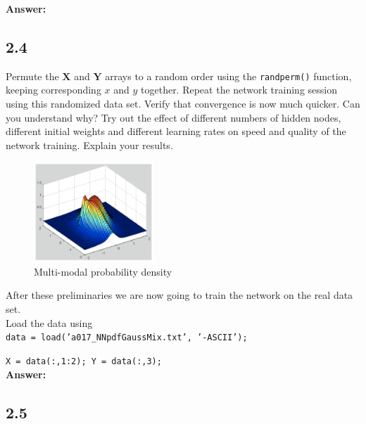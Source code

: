 \documentclass[a4paper]{article}
\begin{document}
\textbf{Answer:}\\







\subsection*{2.4}

Permute the $\textbf{X}$ and $\textbf{Y}$ arrays to a random order using the \texttt{randperm()} function, keeping corresponding $x$ and $y$ together. Repeat the network training session using this randomized data set. Verify that convergence is now much quicker. Can you understand why? Try out the effect of different numbers of hidden nodes, different initial weights and different learning rates on speed and quality of the network training. Explain your results.

\begin{figure}[H]
\center
\includegraphics[width=0.4\textwidth]{Images/multi-modal.png}
\caption{Multi-modal probability density}
\label{Fig:multi-modal}
\end{figure}



After these preliminaries we are now going to train the network on the real data set.\\
Load the data using\\


\hspace{1cm} \texttt{data = load('a017\_NNpdfGaussMix.txt', '-ASCII');}

\hspace{1cm} \texttt{X = data(:,1:2); Y = data(:,3);}\\

\textbf{Answer:}\\






\subsection*{2.5}
\end{document}

